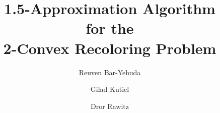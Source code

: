 \title{
1.5-Approximation Algorithm 	\\
for the							\\ 
2-Convex Recoloring Problem
}


\author[tech]{Reuven Bar-Yehuda}
\author[tech]{Gilad Kutiel}
\author[bar]{Dror Rawitz}

\address[tech]{
Department of Computer Science, Technion, Haifa, Israel
}

\address[bar]{
Faculty of Engineering, Bar Ilan University, Ramt-Gan, Israel
}





